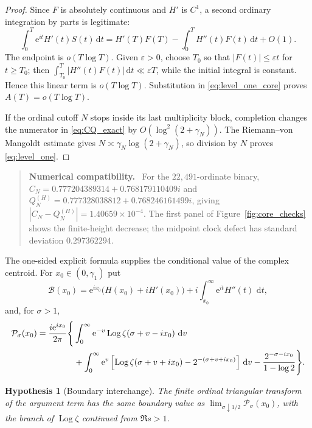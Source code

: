 \documentclass[11pt]{amsart}
\newtheorem{hypothesis}[theorem]{Hypothesis}
\theoremstyle{definition}
\theoremstyle{remark}
\newcommand{\dd}{\,\mathrm d}
\newcommand{\ee}{\mathrm e}
\newcommand{\Log}{\operatorname{Log}}
\newenvironment{numericalcheck}
{\begin{quote}\small\noindent\textbf{Numerical compatibility.}\ }{\end{quote}}
\begin{document}
\begin{proof}
Since $F$ is absolutely continuous and $H'$ is $C^1$, a second ordinary
integration by parts is legitimate:
\[
\int_0^T\ee^{it}H'(t)S(t)\dd t
=H'(T)F(T)-\int_0^T H''(t)F(t)\dd t+O(1).
\]
The endpoint is $o(T\log T)$.  Given $\varepsilon>0$, choose $T_0$ so that
$|F(t)|\le\varepsilon t$ for $t\ge T_0$; then
$\int_{T_0}^T|H''(t)F(t)|\dd t\ll\varepsilon T$, while the initial integral is
constant.  Hence this linear term is $o(T\log T)$.  Substitution in
\eqref{eq:level_one_core} proves $A(T)=o(T\log T)$.

If the ordinal cutoff $N$ stops inside its last multiplicity block, completion
changes the numerator in \eqref{eq:CQ_exact} by $O(\log^2(2+\gamma_N))$.
The Riemann--von Mangoldt estimate gives
$N\asymp\gamma_N\log(2+\gamma_N)$, so division by $N$ proves
\eqref{eq:level_one}.
\end{proof}

\begin{numericalcheck}
For the $22{,}491$-ordinate binary,
$C_N=0.777204389314+0.768179110409i$ and
$Q_N^{(H)}=0.777328038812+0.768246161499i$, giving
$|C_N-Q_N^{(H)}|=1.40659\times10^{-4}$.  The first panel of
Figure~\ref{fig:core_checks} shows the finite-height decrease; the midpoint
clock defect has standard deviation $0.297362294$.
\end{numericalcheck}

The one-sided explicit formula supplies the conditional value of the complex
centroid.  For $x_0\in(0,\gamma_1)$ put
\begin{equation}\label{eq:smooth_centroid_term}
\mathcal B(x_0)=\ee^{ix_0}\bigl(H(x_0)+iH'(x_0)\bigr)
+i\int_{x_0}^{\infty}\ee^{it}H''(t)\,\dd t,
\end{equation}
and, for $\sigma>1$,
\begin{align}
\mathcal P_{\sigma}(x_0)
=\frac{i\ee^{ix_0}}{2\pi}\Bigg\{&
\int_0^\infty\ee^{-v}\Log\zeta(\sigma+v-ix_0)\,\dd v\notag\\
&+\int_0^\infty\ee^{v}
\left[\Log\zeta(\sigma+v+ix_0)-2^{-(\sigma+v+ix_0)}\right]\dd v
-\frac{2^{-\sigma-ix_0}}{1-\log2}\Bigg\}.
\label{eq:prime_centroid_term}
\end{align}

\begin{hypothesis}[Boundary interchange]\label{hyp:boundary}
The finite ordinal triangular transform of the argument term has the same
boundary value as
$\lim_{\sigma\downarrow1/2}\mathcal P_\sigma(x_0)$, with the branch of
$\Log\zeta$ continued from $\Re s>1$.
\end{hypothesis}
\end{document}
